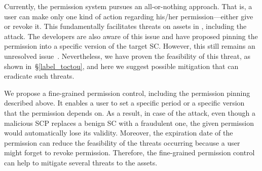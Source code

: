 Currently, the \eos permission system pursues an all-or-nothing
approach. That is, a user can make only one kind of action regarding his/her
permission---either give or revoke it.
%
This fundamentally facilitates threats on assets in \eos, including the \TOCTOU
attack.
%
The \eos developers are also aware of this issue and have proposed pinning
the permission into a specific version of the target SC. However, this still remains
an unresolved issue~\cite{EOSEOSIOCODE}.
%
Nevertheless, we have proven the feasibility of this threat, as shown
in~\S\ref{label_toctou}, and here we suggest possible mitigation that can eradicate
such threats.

We propose a fine-grained permission control, including the permission pinning 
described above. It enables a user to set a specific period or a specific
version that the permission depends on. As a result, in case of the 
\TOCTOU attack, even though a malicious SCP replaces a benign SC with a 
fraudulent one, the given permission would automatically lose its validity. 
Moreover, the expiration date of the permission can reduce the feasibility of 
the threats occurring because a user might forget to revoke permission.
%
Therefore, the fine-grained permission control can help to mitigate several
threats to the \eos assets.
